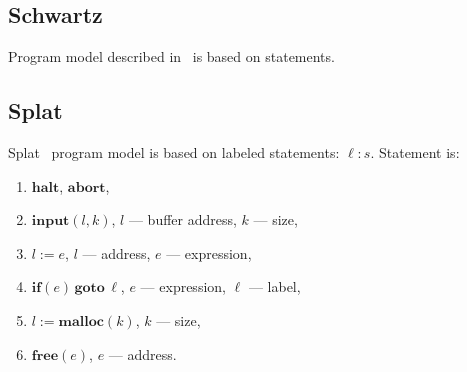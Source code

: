 \documentclass[fleqn,oneside,a4]{article}
\newcommand{\sublevel}{\subsection}
\begin{document}
\sublevel{Schwartz}

Program model described in~\cite{dta_fse} is based on statements.

\sublevel{Splat}

Splat~\cite{splat} program model is based on labeled statements: $\ell: s$.
Statement is:
\begin{enumerate}[itemsep=-0.5ex]
    \item $\textbf{halt}$, $\textbf{abort}$,
    \item $\textbf{input}(l, k)$, $l$ --- buffer address, $k$ --- size,
    \item $l := e$, $l$ --- address, $e$ --- expression,
    \item $\textbf{if}(e)\,\textbf{goto}\, \ell$, $e$ --- expression,
        $\ell$ --- label,
    \item $l := \textbf{malloc}(k)$, $k$ --- size,
    \item $\textbf{free}(e)$, $e$ --- address.
\end{enumerate}

\printindex

{}

\end{document}
